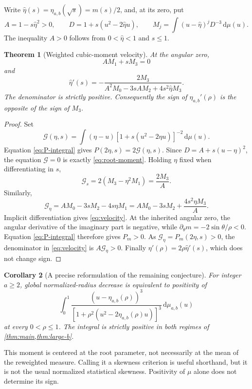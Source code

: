 \documentclass[11pt,letterpaper]{article}
\numberwithin{equation}{section}
\newtheorem{theorem}{Theorem}[section]
\newtheorem{corollary}[theorem]{Corollary}
\theoremstyle{definition}
\theoremstyle{remark}
\newcommand{\dd}{\,\mathrm d}
\begin{document}
Write $\widehat\eta(s)=\eta_{a,b}(\sqrt s)=m(s)/2$, and, at its zero,
put
\begin{equation}\label{eq:cubic-defs}
 A=1-s\widehat\eta^2>0,\qquad
 D=1+s(u^2-2\widehat\eta u),\qquad
 M_j=\int (u-\widehat\eta)^jD^{-3}\dd\mu(u).
\end{equation}
The inequality $A>0$ follows from $0<\widehat\eta<1$ and $s\le1$.

\begin{theorem}[Weighted cubic-moment velocity]\label{thm:cubic}
At the angular zero,
\begin{equation}\label{eq:root-moment}
 A M_1+sM_3=0
\end{equation}
and
\begin{equation}\label{eq:velocity}
 \widehat\eta'(s)=
 -\frac{2M_3}{A^2M_0-3sAM_2+4s^2\widehat\eta M_3}.
\end{equation}
The denominator is strictly positive. Consequently the sign of
$\eta_{a,b}'(\rho)$ is the opposite of the sign of $M_3$.
\end{theorem}
\begin{proof}
Set
\[
 \mathcal G(\eta,s)=\int(\eta-u)
           [1+s(u^2-2\eta u)]^{-2}\dd\mu(u).
\]
Equation \eqref{eq:P-integral} gives $P(2\eta,s)=2\mathcal G(\eta,s)$.
Since $D=A+s(u-\eta)^2$, the equation $\mathcal G=0$ is exactly
\eqref{eq:root-moment}. Holding $\eta$ fixed when differentiating in
$s$,
\[
 \mathcal G_s=2(M_3-\eta^2M_1)=\frac{2M_3}{A}.
\]
Similarly,
\[
 \mathcal G_\eta=A M_0-3sM_2-4s\eta M_1
 =A M_0-3sM_2+\frac{4s^2\eta M_3}{A}.
\]
Implicit differentiation gives \eqref{eq:velocity}.
At the inherited angular zero, the angular derivative of the imaginary
part is negative, while $\partial_\theta m=-2\sin\theta/\rho<0$.
Equation \eqref{eq:P-integral} therefore gives $P_m>0$.
As $\mathcal G_\eta=P_m(2\eta,s)>0$, the denominator in
\eqref{eq:velocity} is $A\mathcal G_\eta>0$.
Finally $\eta'(\rho)=2\rho\widehat\eta'(s)$, which does not change sign.
\end{proof}

\begin{corollary}[A precise reformulation of the remaining conjecture]
For integer $a\ge2$, global normalized-radius decrease is equivalent
to positivity of
\[
 \int_0^1
 \frac{(u-\eta_{a,b}(\rho))^3}
 {[1+\rho^2(u^2-2\eta_{a,b}(\rho)u)]^3}\dd\mu_{a,b}(u)
\]
at every $0<\rho\le1$. The integral is strictly positive in both
regimes of \cref{thm:main,thm:large-b}.
\end{corollary}
This moment is centered at the root parameter, not necessarily at the
mean of the reweighted measure. Calling it a skewness criterion is
useful shorthand, but it is not the usual normalized statistical
skewness. Positivity of $\mu$ alone does not determine its sign.
\end{document}
